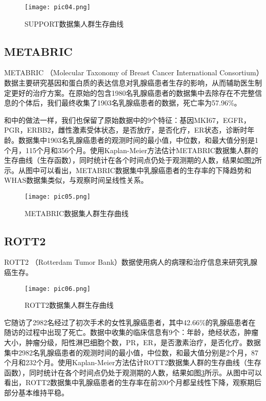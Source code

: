 \begin{figure}[H]
\texttt{[image: pic04.png]}
\caption{SUPPORT数据集人群生存曲线}
\label{pic04}
\end{figure}

\subsection{METABRIC}

METABRIC （Molecular Taxonomy of Breast Cancer International Consortium）数据主要研究基因和蛋白质的表达信息对乳腺癌患者生存的影响，从而辅助医生制定更好的治疗方案。在原始的包含1980名乳腺癌患者的数据集中去除存在不完整信息的个体后，我们最终收集了1903名乳腺癌患者的数据，死亡率为57.96\%。

和\cite{Katzman2018DeepSurv}中的做法一样，我们也保留了原始数据中的9个特征：基因MKI67，EGFR，PGR，ERBB2，雌性激素受体状态，是否放疗，是否化疗，ER状态，诊断时年龄。数据集中1903名乳腺癌患者的观测时间的最小值，中位数，和最大值分别是1个月，115个月和356个月。使用Kaplan-Meier方法估计METABRIC数据集人群的生存曲线（生存函数），同时统计在各个时间点仍处于观测期的人数，结果如图\ref{pic05}所示。从图中可以看出，METABRIC数据集中乳腺癌患者的生存率的下降趋势和WHAS数据集类似，与观察时间呈线性关系。

\begin{figure}[H]
\texttt{[image: pic05.png]}
\caption{METABRIC数据集人群生存曲线}
\label{pic05}
\end{figure}

\subsection{ROTT2}

ROTT2 （Rotterdam Tumor Bank）数据使用病人的病理和治疗信息来研究乳腺癌生存。

\begin{figure}[H]
\texttt{[image: pic06.png]}
\caption{ROTT2数据集人群生存曲线}
\label{pic06}
\end{figure}

它随访了2982名经过了初次手术的女性乳腺癌患者，其中42.66\%的乳腺癌患者在随访的过程中出现了死亡。数据中收集的临床信息有9个：年龄，绝经状态，肿瘤大小，肿瘤分级，阳性淋巴细胞个数，PR，ER，是否激素治疗，是否化疗。数据集中2982名乳腺癌患者的观测时间的最小值，中位数，和最大值分别是2个月，87个月和232个月。使用Kaplan-Meier方法估计ROTT2数据集人群的生存曲线（生存函数），同时统计在各个时间点仍处于观测期的人数，结果如图\ref{pic06}所示。从图中可以看出，ROTT2数据集中乳腺癌患者的生存率在前200个月都呈线性下降，观察期后部分基本维持平稳。

